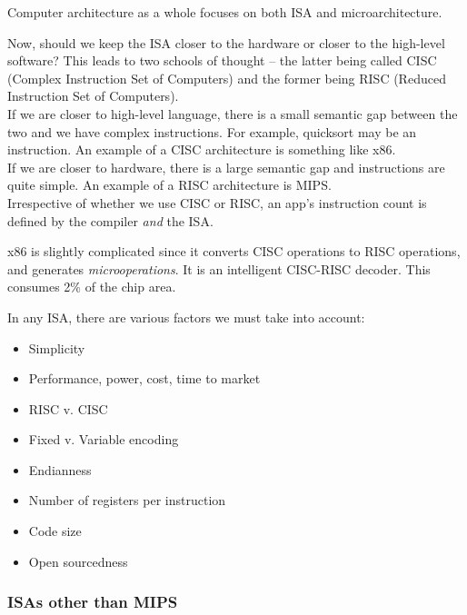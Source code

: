 \documentclass{article}
\begin{document}
			Computer architecture as a whole focuses on both ISA and microarchitecture.


			Now, should we keep the ISA closer to the hardware or closer to the high-level software? This leads to two schools of thought -- the latter being called CISC (Complex Instruction Set of Computers) and the former being RISC (Reduced Instruction Set of Computers).\\
			If we are closer to high-level language, there is a small semantic gap between the two and we have complex instructions. For example, quicksort may be an instruction. An example of a CISC architecture is something like x86.\\
			If we are closer to hardware, there is a large semantic gap and instructions are quite simple. An example of a RISC architecture is MIPS.\\
			Irrespective of whether we use CISC or RISC, an app's instruction count is defined by the compiler \emph{and} the ISA.

			x86 is slightly complicated since it converts CISC operations to RISC operations, and generates \emph{microoperations}. It is an intelligent CISC-RISC decoder. This consumes 2\% of the chip area.

			In any ISA, there are various factors we must take into account:
			\begin{itemize}
				\item Simplicity
				\item Performance, power, cost, time to market
				\item RISC v. CISC
				\item Fixed v. Variable encoding
				\item Endianness
				\item Number of registers per instruction
				\item Code size
				\item Open sourcedness
			\end{itemize}

		\subsubsection{ISAs other than MIPS}
\end{document}
